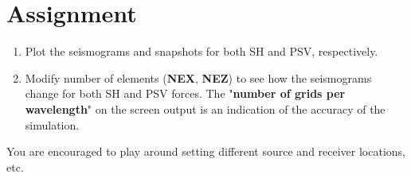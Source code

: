\documentclass[11pt,titlepage,fleqn]{article}
\begin{document}
\section*{Assignment}

\begin{enumerate}

\item Plot the seismograms and snapshots for both SH and PSV, respectively.

\item Modify number of elements ({\bf NEX}, {\bf NEZ}) to see how the seismograms change for both SH and
PSV forces. The "{\bf number of grids per wavelength}" on the screen output is an indication of the accuracy of the simulation.
        
\end{enumerate}

You are encouraged to play around setting different source and receiver locations, etc.
\end{document}
